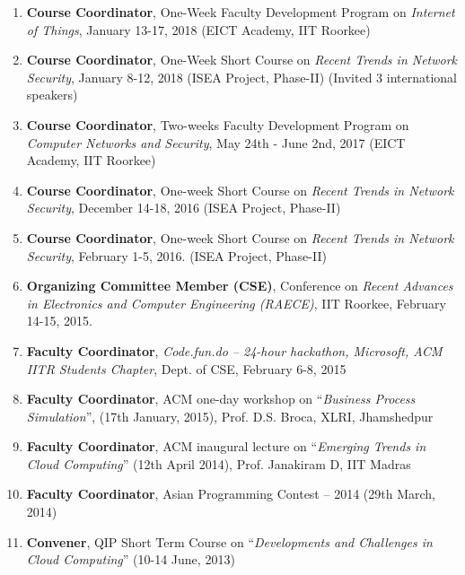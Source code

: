 \begin{enumerate} [label=(E\arabic*).]

\item
\textbf{Course Coordinator}, One-Week Faculty Development Program on \textit{Internet of Things}, January 13-17, 2018 (EICT Academy, IIT Roorkee)

\item
\textbf{Course Coordinator}, One-Week Short Course on \textit{Recent Trends in Network Security}, January 8-12, 2018 (ISEA Project, Phase-II) (Invited 3 international speakers)

\item
\textbf{Course Coordinator}, Two-weeks Faculty Development Program on \textit{Computer Networks and Security}, May 24th - June 2nd, 2017 (EICT Academy, IIT Roorkee)

\item
\textbf{Course Coordinator}, One-week Short Course on \textit{Recent Trends in Network Security}, December 14-18, 2016 (ISEA Project, Phase-II)

\item
\textbf{Course Coordinator}, One-week Short Course on \textit{Recent Trends in Network Security}, February 1-5, 2016. (ISEA Project, Phase-II)

\item
\textbf{Organizing Committee Member (CSE)}, Conference on \textit{Recent Advances in Electronics and Computer Engineering (RAECE)}, IIT Roorkee, February 14-15, 2015.

\item
\textbf{Faculty Coordinator}, \textit{Code.fun.do – 24-hour hackathon, Microsoft, ACM IITR Students Chapter}, Dept. of CSE, February 6-8, 2015

\item
\textbf{Faculty Coordinator}, ACM one-day workshop on “\textit{Business Process Simulation}”, (17th January, 2015), Prof. D.S. Broca, XLRI, Jhamshedpur

\item
\textbf{Faculty Coordinator}, ACM inaugural lecture on “\textit{Emerging Trends in Cloud Computing}” (12th April 2014), Prof. Janakiram D, IIT Madras 

\item
\textbf{Faculty Coordinator}, Asian Programming Contest – 2014 (29th March, 2014)

\item
\textbf{Convener}, QIP Short Term Course on “\textit{Developments and Challenges in Cloud Computing}” (10-14 June, 2013)


\end{enumerate}
